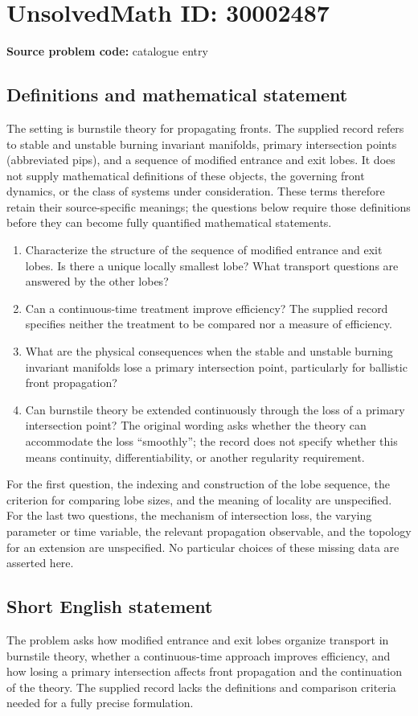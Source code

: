 \documentclass[11pt]{article}
\begin{document}
\section*{UnsolvedMath ID: 30002487}
\textbf{Source problem code:} catalogue entry
\subsection{Definitions and mathematical statement}
The setting is burnstile theory for propagating fronts. The supplied record refers to stable and unstable burning invariant manifolds, primary intersection points (abbreviated pips), and a sequence of modified entrance and exit lobes. It does not supply mathematical definitions of these objects, the governing front dynamics, or the class of systems under consideration. These terms therefore retain their source-specific meanings; the questions below require those definitions before they can become fully quantified mathematical statements.

\begin{enumerate}
\item Characterize the structure of the sequence of modified entrance and exit lobes. Is there a unique locally smallest lobe? What transport questions are answered by the other lobes?
\item Can a continuous-time treatment improve efficiency? The supplied record specifies neither the treatment to be compared nor a measure of efficiency.
\item What are the physical consequences when the stable and unstable burning invariant manifolds lose a primary intersection point, particularly for ballistic front propagation?
\item Can burnstile theory be extended continuously through the loss of a primary intersection point? The original wording asks whether the theory can accommodate the loss ``smoothly''; the record does not specify whether this means continuity, differentiability, or another regularity requirement.
\end{enumerate}

For the first question, the indexing and construction of the lobe sequence, the criterion for comparing lobe sizes, and the meaning of locality are unspecified. For the last two questions, the mechanism of intersection loss, the varying parameter or time variable, the relevant propagation observable, and the topology for an extension are unspecified. No particular choices of these missing data are asserted here.
\subsection{Short English statement}
The problem asks how modified entrance and exit lobes organize transport in burnstile theory, whether a continuous-time approach improves efficiency, and how losing a primary intersection affects front propagation and the continuation of the theory. The supplied record lacks the definitions and comparison criteria needed for a fully precise formulation.
\end{document}
